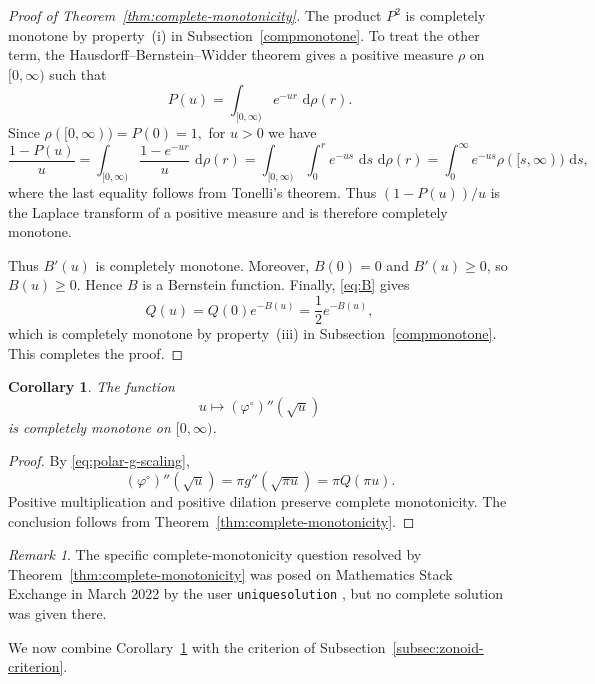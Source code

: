 \documentclass[11pt]{article}
\newtheorem{corollary}[theorem]{Corollary}
\theoremstyle{definition}
\theoremstyle{remark}
\newtheorem{remark}[theorem]{Remark}
\newcommand{\dd}{\,\mathrm d}
\begin{document}
\begin{proof}[Proof of Theorem~\ref{thm:complete-monotonicity}]
The product $P^2$ is completely monotone by property~(i) in
Subsection~\ref{compmonotone}.  To treat the other term, the
Hausdorff--Bernstein--Widder theorem gives a positive measure $\rho$
on $[0,\infty)$ such that
\[
 P(u)=\int_{[0,\infty)}e^{-ur}\,\dd\rho(r).
\]
Since
$
 \rho([0,\infty))=P(0)=1,
$
for $u>0$ we have
$$
 \frac{1-P(u)}u
 =
 \int_{[0,\infty)}\frac{1-e^{-ur}}u\,\dd\rho(r) =
 \int_{[0,\infty)}\int_0^r e^{-us}\,\dd s\,\dd\rho(r)=
 \int_0^\infty e^{-us}\rho([s,\infty))\,\dd s,
$$
where the last equality follows from Tonelli's theorem.  Thus
$(1-P(u))/u$ is the Laplace transform of a positive measure and is
therefore completely monotone.

Thus $B'(u)$ is completely monotone.  Moreover, $B(0)=0$ and $B'(u)\geq0$, so
$B(u)\geq0$.  Hence $B$ is a Bernstein function.  Finally,
\eqref{eq:B} gives
\[
 Q(u)=Q(0)e^{-B(u)}=\frac12e^{-B(u)},
\]
which is completely monotone by property~(iii) in
Subsection~\ref{compmonotone}.  This completes the proof.
\end{proof}

\begin{corollary}\label{cor:polar-profile-CM}
The function
\begin{equation}\label{eq:polar-profile-CM}
 u\longmapsto(\varphi^\circ)''(\sqrt u)
\end{equation}
is completely monotone on $[0,\infty)$.
\end{corollary}

\begin{proof}
By \eqref{eq:polar-g-scaling},
\[
 (\varphi^\circ)''(\sqrt u)
 =\pi g''(\sqrt{\pi u})=\pi Q(\pi u).
\]
Positive multiplication and positive dilation preserve complete
monotonicity.  The conclusion follows from
Theorem~\ref{thm:complete-monotonicity}.
\end{proof}

\begin{remark}\label{rem:MSE-CM}
The specific complete-monotonicity question resolved by Theorem~\ref{thm:complete-monotonicity} was posed on Mathematics Stack Exchange in March 2022 by the user \texttt{uniquesolution} \cite{MSE2022}, but no complete solution was given there.
 
\end{remark}

We now combine Corollary~\ref{cor:polar-profile-CM} with
the criterion of Subsection~\ref{subsec:zonoid-criterion}.
\end{document}
